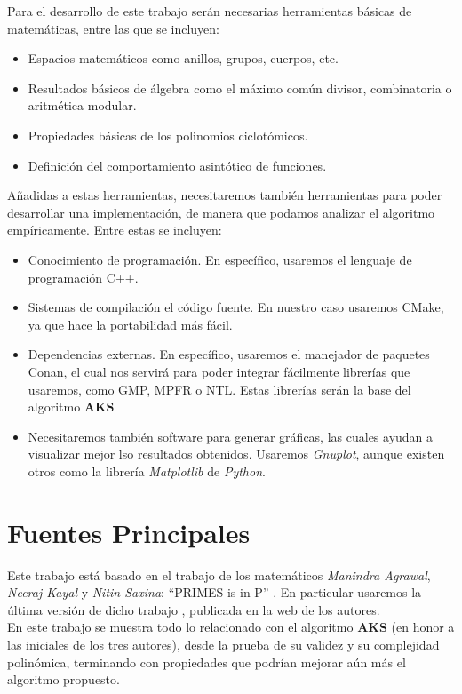Para el desarrollo de este trabajo serán necesarias herramientas básicas de matemáticas, entre las que se incluyen:

\begin{itemize}
	\item Espacios matemáticos como anillos, grupos, cuerpos, etc.
	
	\item Resultados básicos de álgebra como el máximo común divisor, combinatoria o aritmética modular.
	
	\item Propiedades básicas de los polinomios ciclotómicos.
	
	\item Definición del comportamiento asintótico de funciones.
\end{itemize}

Añadidas a estas herramientas, necesitaremos también herramientas para poder desarrollar una implementación, de manera que podamos analizar el algoritmo empíricamente. Entre estas se incluyen:

\begin{itemize}
	\item Conocimiento de programación. En específico, usaremos el lenguaje de programación C++.
	
	\item Sistemas de compilación el código fuente. En nuestro caso usaremos CMake, ya que hace la portabilidad más fácil.
	
	\item Dependencias externas. En específico, usaremos el manejador de paquetes Conan, el cual nos servirá para poder integrar fácilmente librerías que usaremos, como GMP, MPFR o NTL. Estas librerías serán la base del algoritmo \textbf{AKS}
	
	\item Necesitaremos también software para generar gráficas, las cuales ayudan a visualizar mejor lso resultados obtenidos. Usaremos \textit{Gnuplot}, aunque existen otros como la librería \textit{Matplotlib} de \textit{Python}.
\end{itemize}

\section{Fuentes Principales}

Este trabajo está basado en el trabajo de los matemáticos \textit{Manindra Agrawal}, \textit{Neeraj Kayal} y \textit{Nitin Saxina}: ``PRIMES is in P'' \cite{AKS2004} \cite{AKS2019}. En particular usaremos la última versión de dicho trabajo \cite{primes_is_in_p}, publicada en la web de los autores.\\

En este trabajo se muestra todo lo relacionado con el algoritmo \textbf{AKS} (en honor a las iniciales de los tres autores), desde la prueba de su validez y su complejidad polinómica, terminando con propiedades que podrían mejorar aún más el algoritmo propuesto.

\endinput
